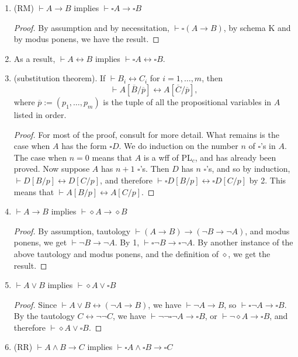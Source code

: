 \documentclass[12pt]{article}
\begin{document}
\begin{enumerate}
\item (RM) $\vdash A\to B$ implies $\vdash \square A \to \square B$
\begin{proof} By assumption and by necessitation, $\vdash \square (A\to B)$, by schema K and by modus ponens, we have the result.
\end{proof}
\item As a result, $\vdash A\leftrightarrow B$ implies $\vdash \square A \leftrightarrow \square B$.
\item (substitution theorem). If $\vdash B_i\leftrightarrow C_i$ for $i=1,\ldots,m$, then $$\vdash A[\overline{B}/\overline{p}]\leftrightarrow A[\overline{C}/\overline{p}],$$ where $\overline{p}:=(p_1,\ldots,p_m)$ is the tuple of all the propositional variables in $A$ listed in order.
\begin{proof} For most of the proof, consult  for more detail.  What remains is the case when $A$ has the form $\square D$.  We do induction on the number $n$ of $\square$'s in $A$.  The case when $n=0$ means that $A$ is a wff of PL$_c$, and has already been proved.  Now suppose $A$ has $n+1$ $\square$'s.  Then $D$ has $n$ $\square$'s, and so by induction, $\vdash D[B/p] \leftrightarrow D[C/p]$, and therefore $\vdash \square D[B/p] \leftrightarrow \square D[C/p]$ by 2.  This means that $\vdash A[B/p]\leftrightarrow A[C/p]$.
\end{proof}
\item $\vdash A\to B$ implies $\vdash \diamond A \to \diamond B$
\begin{proof} By assumption, tautology $\vdash (A\to B)\to (\neg B\to \neg A)$, and modus ponens, we get $\vdash \neg B\to \neg A$.  By 1, $\vdash \square \neg B \to \square \neg A$.  By another instance of the above tautology and modus ponens, and the definition of $\diamond$, we get the result.
\end{proof}
\item $\vdash A \lor B$ implies $\vdash \diamond A \lor \square B$ 
\begin{proof} Since $\vdash A\lor B\leftrightarrow (\neg A\to B)$, we have $\vdash \neg A \to B$, so $\vdash \square \neg A \to \square B$.  By the tautology $C\leftrightarrow \neg \neg C$, we have $\vdash \neg \neg \square \neg A \to \square B$, or $\vdash \neg \diamond A \to \square B$, and therefore $\vdash \diamond A \lor \square B$.
\end{proof}
\item (RR) $\vdash A\land B \to C$ implies $\vdash \square A \land \square B \to \square C$

\end{enumerate}
\end{document}
